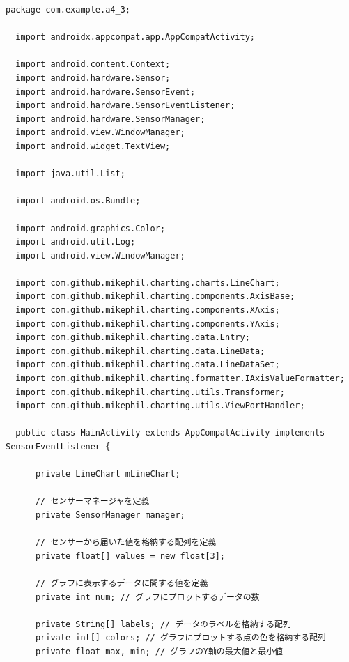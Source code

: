 \documentclass[dvipdfmx,autodetect-engine,titlepage]{jsarticle}
\begin{document}

\begin{lstlisting}[caption=MainActivity.jave,label=java]
  package com.example.a4_3;

  import androidx.appcompat.app.AppCompatActivity;
  
  import android.content.Context;
  import android.hardware.Sensor;
  import android.hardware.SensorEvent;
  import android.hardware.SensorEventListener;
  import android.hardware.SensorManager;
  import android.view.WindowManager;
  import android.widget.TextView;
  
  import java.util.List;
  
  import android.os.Bundle;
  
  import android.graphics.Color;
  import android.util.Log;
  import android.view.WindowManager;
  
  import com.github.mikephil.charting.charts.LineChart;
  import com.github.mikephil.charting.components.AxisBase;
  import com.github.mikephil.charting.components.XAxis;
  import com.github.mikephil.charting.components.YAxis;
  import com.github.mikephil.charting.data.Entry;
  import com.github.mikephil.charting.data.LineData;
  import com.github.mikephil.charting.data.LineDataSet;
  import com.github.mikephil.charting.formatter.IAxisValueFormatter;
  import com.github.mikephil.charting.utils.Transformer;
  import com.github.mikephil.charting.utils.ViewPortHandler;
  
  public class MainActivity extends AppCompatActivity implements SensorEventListener {
  
      private LineChart mLineChart;
  
      // センサーマネージャを定義
      private SensorManager manager;
  
      // センサーから届いた値を格納する配列を定義
      private float[] values = new float[3];
  
      // グラフに表示するデータに関する値を定義
      private int num; // グラフにプロットするデータの数
  
      private String[] labels; // データのラベルを格納する配列
      private int[] colors; // グラフにプロットする点の色を格納する配列
      private float max, min; // グラフのY軸の最大値と最小値
  

\end{lstlisting}
\end{document}

